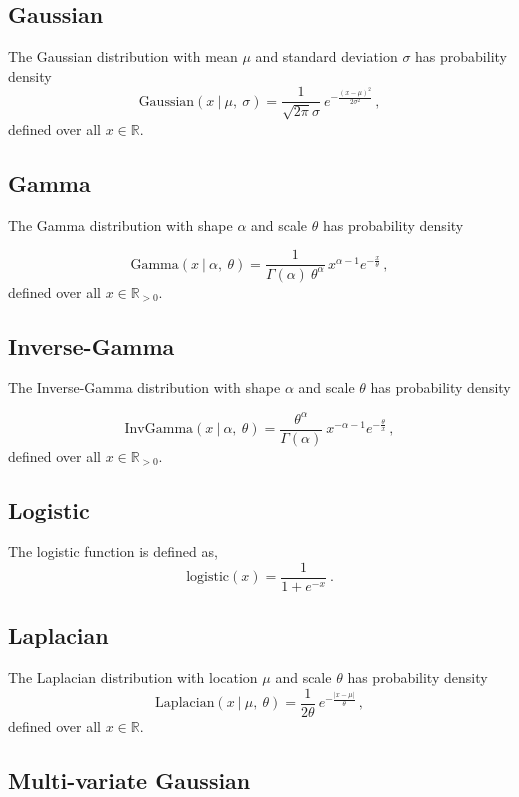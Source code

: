 \documentclass[12pt,letterpaper,onecolumn,oneside]{article}
\begin{document}
\begin{appendices}
\subsection{Gaussian}

The Gaussian distribution with mean $\mu$ and standard deviation
$\sigma$ has probability density
\[ \text{Gaussian}(x \ | \ \mu, \ \sigma) = \frac{1}{\sqrt{2\pi}\sigma}
\ 
e^{-\frac{(x - \mu)^2}{2\sigma^2}} \, ,\] 
defined over all $x \in \mathbb{R}$.

\subsection{Gamma}

The Gamma distribution with shape $\alpha$ and scale $\theta$ has probability
density 

\[\text{Gamma}(x \ | \ \alpha, \ \theta) = \frac{1}{\Gamma(\alpha) \ 
  \theta^\alpha} \,  x^{\alpha-1}  e^{-\frac{x}{\theta}} \, , \]
defined over all $x \in \mathbb{R}_{>0}$.

\subsection{Inverse-Gamma}

The Inverse-Gamma distribution with shape $\alpha$ and scale $\theta$
has probability density

\[\text{InvGamma}(x \ | \ \alpha, \ \theta) 
= \frac{\theta^\alpha}{\Gamma(\alpha)}
 \ x^{-\alpha-1} e^{-\frac{\theta}{x}} \, , \] defined over all $x \in
 \mathbb{R}_{>0}$.

\subsection{Logistic}

The logistic function is defined as,
\[ \text{logistic}(x) = \frac{1}{1 + e^{-x}} \ . \]

\subsection{Laplacian}

The Laplacian distribution with location $\mu$ and scale $\theta$ has
probability density
\[ \text{Laplacian}(x \ | \ \mu, \ \theta) = \frac{1}{2 \theta} \ 
e^{-\frac{|x - \mu|}{\theta}}
\, ,\]
defined over all $x \in \mathbb{R}$.


\subsection{Multi-variate Gaussian}


\end{appendices}
\end{document}
